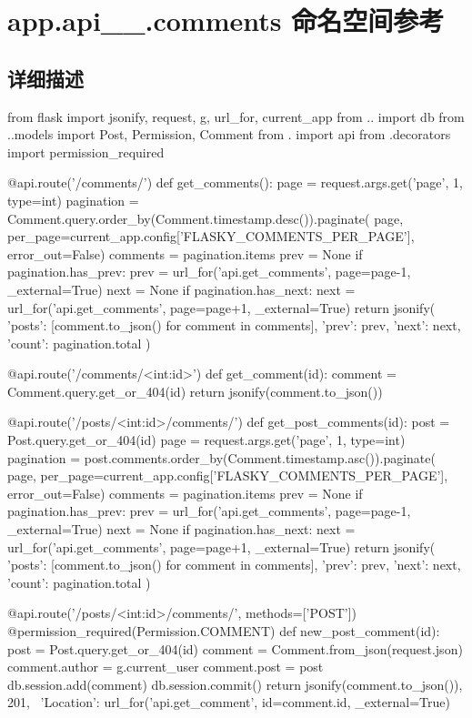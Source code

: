 \hypertarget{namespaceapp_1_1api__1__0_1_1comments}{}\section{app.\+api\+\_\+\_.\+comments 命名空间参考}
\label{namespaceapp_1_1api__1__0_1_1comments}


\subsection{详细描述}
\begin{DoxyVerb}from flask import jsonify, request, g, url_for, current_app
from .. import db
from ..models import Post, Permission, Comment
from . import api
from .decorators import permission_required


@api.route('/comments/')
def get_comments():
page = request.args.get('page', 1, type=int)
pagination = Comment.query.order_by(Comment.timestamp.desc()).paginate(
    page, per_page=current_app.config['FLASKY_COMMENTS_PER_PAGE'],
    error_out=False)
comments = pagination.items
prev = None
if pagination.has_prev:
    prev = url_for('api.get_comments', page=page-1, _external=True)
next = None
if pagination.has_next:
    next = url_for('api.get_comments', page=page+1, _external=True)
return jsonify({
    'posts': [comment.to_json() for comment in comments],
    'prev': prev,
    'next': next,
    'count': pagination.total
})


@api.route('/comments/<int:id>')
def get_comment(id):
comment = Comment.query.get_or_404(id)
return jsonify(comment.to_json())


@api.route('/posts/<int:id>/comments/')
def get_post_comments(id):
post = Post.query.get_or_404(id)
page = request.args.get('page', 1, type=int)
pagination = post.comments.order_by(Comment.timestamp.asc()).paginate(
    page, per_page=current_app.config['FLASKY_COMMENTS_PER_PAGE'],
    error_out=False)
comments = pagination.items
prev = None
if pagination.has_prev:
    prev = url_for('api.get_comments', page=page-1, _external=True)
next = None
if pagination.has_next:
    next = url_for('api.get_comments', page=page+1, _external=True)
return jsonify({
    'posts': [comment.to_json() for comment in comments],
    'prev': prev,
    'next': next,
    'count': pagination.total
})


@api.route('/posts/<int:id>/comments/', methods=['POST'])
@permission_required(Permission.COMMENT)
def new_post_comment(id):
post = Post.query.get_or_404(id)
comment = Comment.from_json(request.json)
comment.author = g.current_user
comment.post = post
db.session.add(comment)
db.session.commit()
return jsonify(comment.to_json()), 201, \
    {'Location': url_for('api.get_comment', id=comment.id,
                         _external=True)}
\end{DoxyVerb}
 